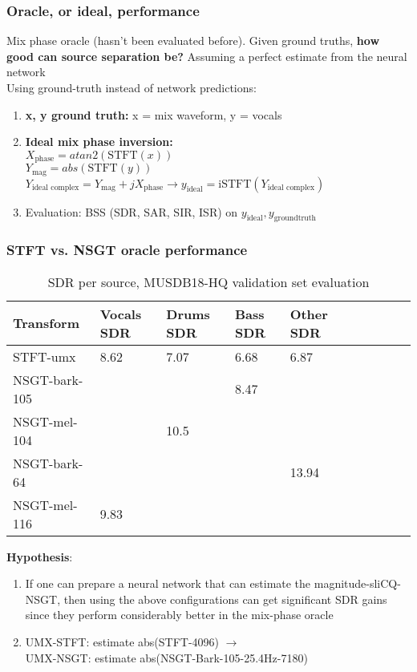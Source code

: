 \documentclass[usenames,dvipsnames]{beamer}
\begin{document}
\begin{frame}
	\frametitle{Oracle, or ideal, performance}
	Mix phase oracle (hasn't been evaluated before). Given ground truths, \textbf{how good can source separation be?} Assuming a perfect estimate from the neural network\\

	Using ground-truth instead of network predictions:
	\begin{enumerate}
		\item
			\textbf{x, y ground truth:} x = mix waveform, y = vocals
		\item
			\textbf{Ideal mix phase inversion:}\\
			\qquad $X_{\text{phase}} = atan2(\text{STFT}(x))$\\
			\qquad $Y_{\text{mag}} = abs(\text{STFT}(y))$\\
			\qquad $Y_{\text{ideal complex}} = Y_{\text{mag}} + j X_{\text{phase}} \rightarrow y_{\text{ideal}} = \text{iSTFT}(Y_{\text{ideal complex}})$
		\item
			Evaluation: BSS (SDR, SAR, SIR, ISR) on $y_{\text{ideal}}, y_{\text{groundtruth}}$
	\end{enumerate}
\end{frame}

\begin{frame}
	\frametitle{STFT vs. NSGT oracle performance}
\begin{table}[ht]
	\centering
\begin{tabular}{ |l|l|l|l|l|c|c|c|c|c| }
	 \hline
	  Transform & Vocals SDR & Drums SDR & Bass SDR & Other SDR \\
	 \hline
	 \hline
	 STFT-umx & 8.62 & 7.07 & 6.68 & 6.87 \\
	 \hline
	 NSGT-bark-105 &  & & 8.47 & \\
	 \hline
	 NSGT-mel-104 & & 10.5 & & \\
	 \hline
	 NSGT-bark-64 & & & & 13.94 \\
	 \hline
	 NSGT-mel-116 & 9.83 & & & \\
	 \hline
\end{tabular}
	\caption{SDR per source, MUSDB18-HQ validation set evaluation}
	\vspace{-0.5em}
\end{table}
	\textbf{Hypothesis}:
	\begin{enumerate}
		\item
			If one can prepare a neural network that can estimate the magnitude-sliCQ-NSGT, then using the above configurations can get significant SDR gains since they perform considerably better in the mix-phase oracle
		\item
			UMX-STFT: estimate abs(STFT-4096) $\rightarrow$ \\
			\qquad UMX-NSGT: estimate abs(NSGT-Bark-105-25.4Hz-7180)
	\end{enumerate}
\end{frame}
\end{document}
